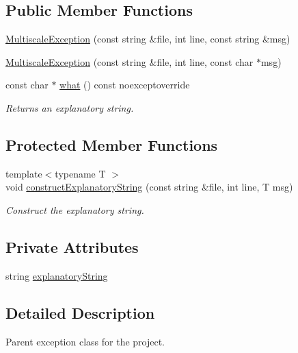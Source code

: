 \subsection*{Public Member Functions}
\begin{DoxyCompactItemize}
\item 
\hyperlink{classmultiscale_1_1MultiscaleException_a6eb7d129f239cc1c4f497b1bbaf94fa5}{Multiscale\-Exception} (const string \&file, int line, const string \&msg)
\item 
\hyperlink{classmultiscale_1_1MultiscaleException_a3c0023538ce22fcd663b98a39b12d5a5}{Multiscale\-Exception} (const string \&file, int line, const char $\ast$msg)
\item 
const char $\ast$ \hyperlink{classmultiscale_1_1MultiscaleException_a2750c3e86e792919a8a4323b83800530}{what} () const noexceptoverride
\begin{DoxyCompactList}\small\item\em Returns an explanatory string. \end{DoxyCompactList}\end{DoxyCompactItemize}
\subsection*{Protected Member Functions}
\begin{DoxyCompactItemize}
\item 
{\footnotesize template$<$typename T $>$ }\\void \hyperlink{classmultiscale_1_1MultiscaleException_a294b01073c3974e69114bec9f5f87c0a}{construct\-Explanatory\-String} (const string \&file, int line, T msg)
\begin{DoxyCompactList}\small\item\em Construct the explanatory string. \end{DoxyCompactList}\end{DoxyCompactItemize}
\subsection*{Private Attributes}
\begin{DoxyCompactItemize}
\item 
string \hyperlink{classmultiscale_1_1MultiscaleException_acf3042077605955cbb36a4472ed80233}{explanatory\-String}
\end{DoxyCompactItemize}


\subsection{Detailed Description}
Parent exception class for the project. 

